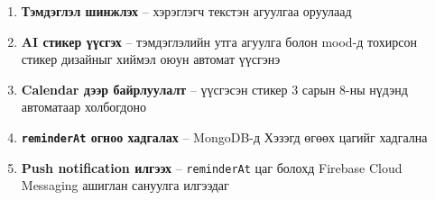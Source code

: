 \begin{enumerate}
  \item \textbf{Тэмдэглэл шинжлэх} -- хэрэглэгч текстэн агуулгаа оруулаад
  \item \textbf{AI стикер үүсгэх} -- тэмдэглэлийн утга агуулга болон mood-д тохирсон
    стикер дизайныг хиймэл оюун автомат үүсгэнэ
  \item \textbf{Calendar дээр байрлуулалт} -- үүсгэсэн стикер 3 сарын 8-ны нүдэнд
    автоматаар холбогдоно
  \item \textbf{\texttt{reminderAt} огноо хадгалах} -- MongoDB-д Хэзэгд өгөөх цагийг хадгална
  \item \textbf{Push notification илгээх} -- \texttt{reminderAt} цаг болохд
    Firebase Cloud Messaging ашиглан сануулга илгээдаг~\cite{firebase2023}
\end{enumerate}

